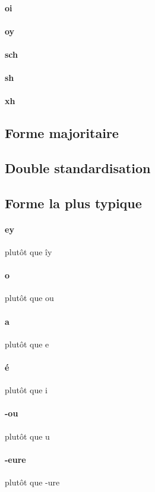 \documentclass[french]{article}
\begin{document}
\paragraph{oi}
\paragraph{oy}
\paragraph{sch}
\paragraph{sh}
\paragraph{xh}

\subsection{Forme majoritaire}

\subsection{Double standardisation}

\subsection{Forme la plus typique}

\paragraph{ey} plutôt que îy
\paragraph{o} plutôt que ou
\paragraph{a} plutôt que e
\paragraph{é} plutôt que i
\paragraph{-ou} plutôt que u
\paragraph{-eure} plutôt que -ure
\end{document}
